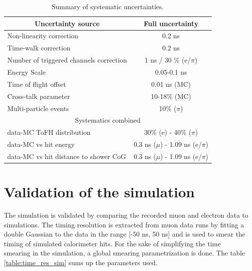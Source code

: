 \begin{table}[htb!]
	\centering
	\caption{Summary of systematic uncertainties.}
	\label{table:time_syst}
	\begin{tabular}{@{} lc @{}}
		\toprule
		\multicolumn{1}{c}{Uncertainty source} & Full uncertainty \\
		\midrule
		Non-linearity correction & 0.2 ns \\
		Time-walk correction & 0.2 ns \\
		Number of triggered channels correction & 1 ns / 30 \% (e/$\pi$)\\
		Energy Scale & 0.05-0.1 ns \\
		Time of flight offset & 0.01 ns (MC) \\
		Cross-talk parameter & 10-18\% (MC)\\
		Multi-particle events & 10\% ($\pi$) \\
		\midrule
		\midrule
		\multicolumn{2}{c}{Systematics combined} \\
		\midrule
		data-MC ToFH distribution & 30\% (e) - 40\% ($\pi$) \\
		data-MC vs hit energy & 0.3 ns ($\mu$) - 1.09 ns (e/$\pi$)\\
		data-MC vs hit distance to shower CoG & 0.3 ns ($\mu$) - 1.09 ns (e/$\pi$)\\
		\bottomrule
	\end{tabular}
\end{table}

\section{Validation of the simulation}

The simulation is validated by comparing the recorded muon and electron data to simulations. The timing resolution is extracted from muon data runs by fitting a double Gaussian to the data in the range [-50 ns, 50 ns] and is used to smear the timing of simulated calorimeter hits. For the sake of simplifying the time smearing in the simulation, a global smearing parametrization is done. The table \ref{table:time_res_sim} sums up the parameters used.


